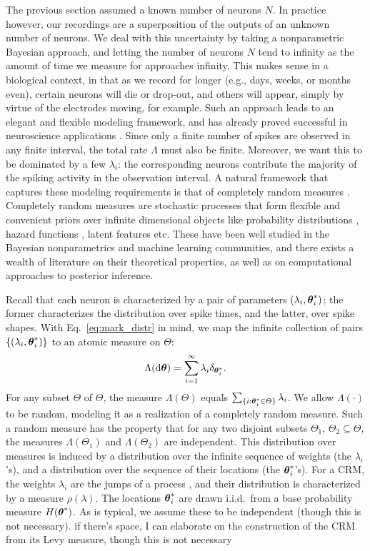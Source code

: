 The previous section assumed a known number of neurons $N$. In practice however, our recordings are a superposition of the outputs of an unknown
number of neurons. We deal with this uncertainty by taking a nonparametric Bayesian approach, and letting the number of neurons $N$ tend to infinity as the amount of time we measure for approaches infinity.  This makes sense in a biological context, in that as we record for longer (e.g., days, weeks, or months even), certain neurons will die or drop-out, and others will appear, simply by virtue of the electrodes moving, for example. 
Such an approach leads to an elegant and flexible modeling framework, and has  already proved successful in neuroscience applications
\citep{WoodBla2008}.
Since only a finite number of spikes are observed in any finite interval, the total rate $\Lambda$ must 
also be finite. Moreover, we want this to be dominated by a few $\lambda_i$: the corresponding neurons contribute the majority of the spiking
activity in the observation interval. 
A natural framework that captures these  modeling requirements is that of completely random measures \citep{Kingman:PJM67}.
Completely random measures are stochastic processes that form flexible and convenient priors over
infinite dimensional objects like probability distributions \citep{JamesLP09}, hazard functions \citep{Hjo1990}, latent features \citep{ThiJor2007} etc. 
These have been well studied in the Bayesian nonparametrics and machine learning communities, and there exists a wealth of literature on
their theoretical properties, as well as on computational approaches to posterior inference.

Recall that each neuron is characterized by a pair of parameters $(\lambda_i, \boldsymbol{\theta}^*_i)$; the former characterizes the distribution over spike times, 
and the latter, over spike
shapes. With Eq.~\eqref{eq:mark_distr} in mind, we map the infinite collection of pairs $\{(\lambda_i, \boldsymbol{\theta}^*_i)\}$ to an atomic measure on $\Theta$:
\begin{align}
  \Lambda(\mathrm{d} \boldsymbol{\theta}) = \sum_{i=1}^{\infty} \lambda_i \delta_{\boldsymbol{\theta}^*_i}.
\end{align}
For any subset $\varTheta$ of $\Theta$, the measure $\Lambda(\varTheta)$ equals \( \sum_{\{ i: \boldsymbol{\theta}^*_i \in \varTheta \} } \lambda_i\). We allow $\Lambda(\cdot)$ to be random,
modeling it as a realization of a completely random measure. Such a random measure has the property that for any two disjoint subsets $\varTheta_1$,  $\varTheta_2 \subseteq \Theta$, the measures $\Lambda(\varTheta_1)$ and $\Lambda(\varTheta_2)$ are independent. 
This distribution over measures is induced by a distribution
over the infinite sequence of weights (the $\lambda_i$'s), and a distribution over the sequence of their locations (the $\boldsymbol{\theta}^*_i$'s). 
For a CRM, the weights $\lambda_i$ are the jumps of a \Levy process \citep{Sato90}, and their distribution is characterized by a 
\Levy measure $\rho(\lambda)$. The locations $\boldsymbol{\theta}^*_i$ are drawn i.i.d.\  from a base probability measure $H(\boldsymbol{\theta}^*)$.
As is typical, we assume these to be independent (though this is not necessary). {\color{green} if there's space, I
can elaborate on the construction of the CRM from its Levy measure, though this is not necessary}

